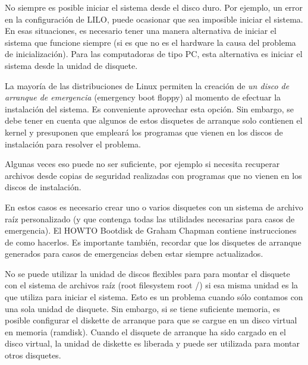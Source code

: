 \documentclass[12pt]{article}
\begin{document}
 No siempre es posible iniciar el sistema desde el disco duro. Por
ejemplo, un error en la configuración de LILO, puede ocasionar que sea imposible
iniciar el sistema. En esas situaciones, es necesario tener una manera
alternativa de iniciar el sistema que funcione siempre (si es que no es el
hardware la causa del problema de inicialización). Para las computadoras de tipo
PC, esta alternativa es iniciar el sistema desde la unidad de disquete.  

 La mayoría de las distribuciones de Linux permiten la creación de
\textit{un disco de arranque de emergencia} (emergency boot
floppy) al momento de efectuar la instalación del sistema. Es conveniente
aprovechar esta opción. Sin embargo, se debe tener en cuenta que algunos de
estos disquetes de arranque solo contienen el kernel y presuponen que empleará
los programas que vienen en los discos de instalación para resolver el problema.


 Algunas veces eso puede no ser suficiente, por ejemplo si necesita
recuperar archivos desde copias de seguridad realizadas con programas que no
vienen en los discos de instalación.  

 En estos casos es necesario crear uno o varios disquetes con un sistema
de archivo raíz personalizado (y que contenga todas las utilidades necesarias
para casos de emergencia). El HOWTO Bootdisk de Graham Chapman contiene
instrucciones de como hacerlos. Es importante también, recordar que los
disquetes de arranque generados para casos de emergencias deben estar siempre
actualizados.  

 No se puede utilizar la unidad de discos flexibles para para montar el
disquete con el sistema de archivos raíz (root filesystem root /) si esa misma
unidad es la que utiliza para iniciar el sistema. Esto es un problema cuando
sólo contamos con una sola unidad de disquete. Sin embargo, si se tiene
suficiente memoria, es posible configurar el diskette de arranque para que se
cargue en un disco virtual en memoria (ramdisk). Cuando el disquete de arranque
ha sido cargado en el disco virtual, la unidad de diskette es liberada y puede
ser utilizada para montar otros disquetes.  
\end{document}
